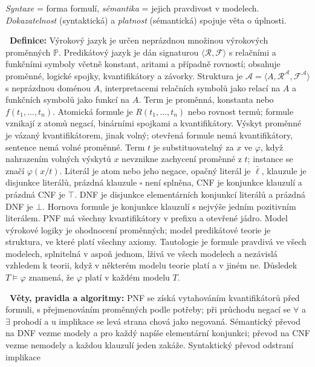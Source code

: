 \ucivo
\begin{intuice}
\emph{Syntaxe} = forma formulí, \emph{sémantika} = jejich pravdivost v modelech. \emph{Dokazatelnost}
(syntaktická) a \emph{platnost} (sémantická) spojuje věta o úplnosti.
\end{intuice}

\begin{odpoved}
\setlength{\parskip}{2pt}
\noindent{}\ \textbf{Definice:} Výrokový jazyk je určen neprázdnou množinou
výrokových proměnných $\mathbb P$. Predikátový jazyk je dán signaturou
$\langle\mathcal R,\mathcal F\rangle$ s relačními a funkčními symboly včetně konstant,
aritami a případně rovností; obsahuje proměnné, logické spojky, kvantifikátory a závorky.
Struktura je $\mathcal A=\langle A,\mathcal R^\mathcal A,\mathcal F^\mathcal A\rangle$
s neprázdnou doménou $A$, interpretacemi relačních symbolů jako relací na $A$ a funkčních
symbolů jako funkcí na $A$. Term je proměnná, konstanta nebo $f(t_1,\ldots,t_n)$.
Atomická formule je $R(t_1,\ldots,t_n)$ nebo rovnost termů; formule vznikají z atomů
negací, binárními spojkami a kvantifikátory. Výskyt proměnné je vázaný kvantifikátorem,
jinak volný; otevřená formule nemá kvantifikátory, sentence nemá volné proměnné. Term
$t$ je substituovatelný za $x$ ve $\varphi$, když nahrazením volných výskytů $x$ nevznikne
zachycení proměnné z $t$; instance se značí $\varphi(x/t)$. Literál je atom nebo jeho
negace, opačný literál je $\bar\ell$, klauzule je disjunkce literálů, prázdná klauzule
$\square$ není splněna, CNF je konjunkce klauzulí a prázdná CNF je $\top$. DNF je disjunkce
elementárních konjunkcí literálů a prázdná DNF je $\bot$. Hornova formule je konjunkce
klauzulí s nejvýše jedním pozitivním literálem. PNF má všechny kvantifikátory v prefixu
a otevřené jádro. Model výrokové logiky je ohodnocení proměnných; model predikátové
teorie je struktura, ve které platí všechny axiomy. Tautologie je formule pravdivá ve
všech modelech, splnitelná v aspoň jednom, lživá ve všech modelech a nezávislá vzhledem k teorii,
když v některém modelu teorie platí a v jiném ne. Důsledek $T\models\varphi$ znamená,
že $\varphi$ platí v každém modelu $T$.\par
\noindent{}\ \textbf{Věty, pravidla a algoritmy:} PNF se získá vytahováním
kvantifikátorů před formuli, s přejmenováním proměnných podle potřeby; při průchodu
negací se $\forall$ a $\exists$ prohodí a u implikace se levá strana chová jako negovaná.
Sémantický převod na DNF vezme modely a pro každý napíše elementární konjunkci; převod
na CNF vezme nemodely a každou klauzulí jeden zakáže. Syntaktický převod odstraní implikace

\end{odpoved}
